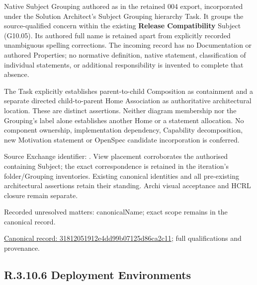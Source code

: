 Native Subject Grouping authored as \texttt{} in the retained 004 export,
incorporated under the Solution Architect's Subject Grouping hierarchy Task.
It groups the source-qualified \texttt{} concern within
the existing \textbf{Release Compatibility} Subject (G10.05). Its authored full name
is retained apart from explicitly recorded unambiguous spelling corrections.
The incoming record has no Documentation or authored Properties; no normative
definition, native statement, classification of individual statements, or
additional responsibility is invented to complete that absence.



The Task explicitly establishes parent-to-child Composition as containment and
a separate directed child-to-parent Home Association as authoritative architectural
location. These are distinct assertions. Neither diagram membership nor the
Grouping's label alone establishes another Home or a statement allocation.
No component ownership, implementation dependency, Capability decomposition,
new Motivation statement or OpenSpec candidate incorporation is conferred.



Source Exchange identifier: \texttt{}. View placement corroborates
the authorised containing Subject; the exact correspondence is retained in the
iteration's folder/Grouping inventories. Existing canonical identities and all
pre-existing architectural assertions retain their standing. Archi visual
acceptance and HCRL closure remain separate.


{\small Recorded unresolved matters: canonicalName; exact scope remains in the canonical record.}\par
{\footnotesize \href{../../../../continuum/grouping/31812051912e4dd99b07125d86ca2c11.md}{Canonical record: 31812051912e4dd99b07125d86ca2c11}; full qualifications and provenance.}\par
\subsection*{R.3.10.6 Deployment Environments}
\label{navigation:R.3.10.6}

